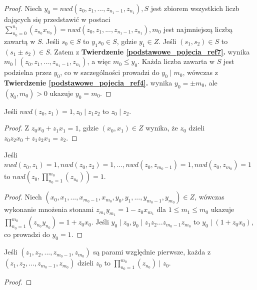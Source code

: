 \begin{appendices}
\begin{theorem}
\begin{proof}
Niech $y_0 = nwd(z_0, z_1, ..., z_{n_1 - 1}, z_{n_1}), S$ jest zbiorem wszystkich liczb dających się przedstawić w postaci $\sum_{n_0 = 0}^{n_1}(z_{n_0}x_{n_0}) = nwd(z_0, z_1, ..., z_{n_1 - 1}, z_{n_1}), m_0$ jest najmniejszą liczbą zawartą w $S$. Jeśli $s_0 \in S$ to $y_1s_0 \in S$, gdzie $y_1 \in Z$. Jeśli $(s_1, s_2) \in S$ to $(s_1 \pm s_2) \in S$. Zatem z \textbf{Twierdzenie \ref{podstawowe_pojecia_ref7}.} wynika $m_0 \mid (z_0, z_1, ..., z_{n_1 - 1}, z_{n_1})$, a więc $m_0 \leq y_0$. Każda liczba zawarta w $S$ jest podzielna przez $y_0$, co w szczególności prowadzi do $y_0 \mid m_0$, wówczas z \textbf{Twierdzenie \ref{podstawowe_pojecia_ref4}.} wynika $y_0 = \pm m_0$, ale $(y_0, m_0) > 0$ ukazuje $y_0 = m_0$.
\end{proof}
\end{theorem}
\begin{theorem}
Jeśli $nwd(z_0, z_1) = 1, z_0 \mid z_1z_2$ to $z_0 \mid z_2$.
\begin{proof}
Z $z_0x_0 + z_1x_1 = 1$, gdzie $(x_0, x_1) \in Z$ wynika, że $z_0$ dzieli $z_0z_2x_0 + z_1z_2x_1 = z_2$.
\end{proof}
\end{theorem}
\begin{theorem}
Jeśli $nwd(z_0, z_1) = 1, nwd(z_0, z_2) = 1, ..., nwd(z_0, z_{m_0 - 1}) = 1, nwd(z_0, z_{m_0}) = 1$ to $nwd(z_0,
\prod_{n_0 = 1}^{m_0}(z_{n_0})) = 1$.
\begin{proof}
Niech $(x_0, x_1, ..., x_{m_0 - 1}, x_{m_0}, y_0, y_1, ..., y_{m_0 - 1}, y_{m_0}) \in Z$, wówczas wykonanie mnożenia stonami $z_{m_1}y_{m_1} = 1 - z_0x_{m_1}$ dla $1 \leq m_1 \leq m_0$ ukazuje $\prod_{n_0 = 1}^{m_0}(z_{n_0}y_{n_0}) = 1 + z_0x_0$. Jeśli $y_0 \mid z_0, y_0 \mid z_1z_2...z_{m_0 - 1}z_{m_0}$ to $y_0 \mid (1 + z_0x_0)$, co prowadzi do $y_0 = 1$.
\end{proof}
\end{theorem}
\begin{theorem}
Jeśli $(z_1, z_2, ..., z_{m_0 - 1}, z_{m_0})$ są parami względnie pierwsze, każda z $(z_1, z_2, ..., z_{m_0 - 1}, z_{m_0})$ dzieli $z_0$ to $\prod_{n_0 = 1}^{m_0}(z_{n_0}) \mid z_0$.
\begin{proof}

\end{proof}
\end{theorem}
\end{appendices}
